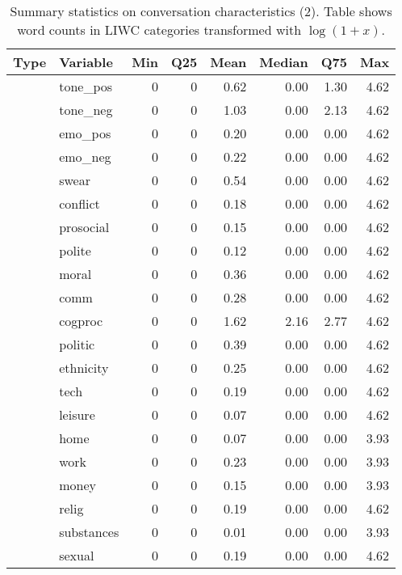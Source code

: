 \begin{table}[!h]
\centering
\caption{\label{tab:summ-tab3}Summary statistics on conversation characteristics (2). Table shows word counts in LIWC categories transformed with $\log(1+x)$.}
\centering
\begin{tabular}[t]{llrrrrrr}
\toprule
Type & Variable & Min & Q25 & Mean & Median & Q75 & Max\\
\midrule
 & tone\_pos & 0 & 0 & 0.62 & 0.00 & 1.30 & 4.62\\
\cmidrule{2-8}
 & tone\_neg & 0 & 0 & 1.03 & 0.00 & 2.13 & 4.62\\
\cmidrule{2-8}
 & emo\_pos & 0 & 0 & 0.20 & 0.00 & 0.00 & 4.62\\
\cmidrule{2-8}
 & emo\_neg & 0 & 0 & 0.22 & 0.00 & 0.00 & 4.62\\
\cmidrule{2-8}
 & swear & 0 & 0 & 0.54 & 0.00 & 0.00 & 4.62\\
\cmidrule{2-8}
 & conflict & 0 & 0 & 0.18 & 0.00 & 0.00 & 4.62\\
\cmidrule{2-8}
 & prosocial & 0 & 0 & 0.15 & 0.00 & 0.00 & 4.62\\
\cmidrule{2-8}
 & polite & 0 & 0 & 0.12 & 0.00 & 0.00 & 4.62\\
\cmidrule{2-8}
 & moral & 0 & 0 & 0.36 & 0.00 & 0.00 & 4.62\\
\cmidrule{2-8}
 & comm & 0 & 0 & 0.28 & 0.00 & 0.00 & 4.62\\
\cmidrule{2-8}
 & cogproc & 0 & 0 & 1.62 & 2.16 & 2.77 & 4.62\\
\cmidrule{2-8}
 & politic & 0 & 0 & 0.39 & 0.00 & 0.00 & 4.62\\
\cmidrule{2-8}
 & ethnicity & 0 & 0 & 0.25 & 0.00 & 0.00 & 4.62\\
\cmidrule{2-8}
 & tech & 0 & 0 & 0.19 & 0.00 & 0.00 & 4.62\\
\cmidrule{2-8}
 & leisure & 0 & 0 & 0.07 & 0.00 & 0.00 & 4.62\\
\cmidrule{2-8}
 & home & 0 & 0 & 0.07 & 0.00 & 0.00 & 3.93\\
\cmidrule{2-8}
 & work & 0 & 0 & 0.23 & 0.00 & 0.00 & 3.93\\
\cmidrule{2-8}
 & money & 0 & 0 & 0.15 & 0.00 & 0.00 & 3.93\\
\cmidrule{2-8}
 & relig & 0 & 0 & 0.19 & 0.00 & 0.00 & 4.62\\
\cmidrule{2-8}
 & substances & 0 & 0 & 0.01 & 0.00 & 0.00 & 3.93\\
\cmidrule{2-8}
 & sexual & 0 & 0 & 0.19 & 0.00 & 0.00 & 4.62\\
\cmidrule{2-8}

\end{tabular}
\end{table}
